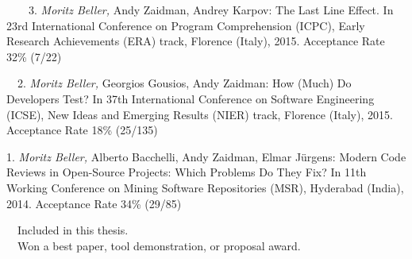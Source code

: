 \begin{etaremune}
{\item[\faTrophy~~\faFileTextO~~3.] \emph{Moritz Beller,} Andy Zaidman, Andrey Karpov: The Last
  Line Effect. In 23rd International Conference on Program Comprehension (ICPC), Early Research
  Achievements (ERA) track, Florence (Italy), 2015. Acceptance Rate 32\% (7/22)

\item[\faFileTextO~~2.] \emph{Moritz Beller,} Georgios Gousios, Andy Zaidman: How (Much) Do
  Developers Test? In 37th International Conference on Software Engineering (ICSE), New Ideas and
  Emerging Results (NIER) track, Florence (Italy), 2015. Acceptance Rate 18\% (25/135)

\item[1.] \emph{Moritz Beller,} Alberto Bacchelli, Andy Zaidman, Elmar Jürgens:
  Modern Code Reviews in Open-Source Projects: Which Problems Do They Fix? In 11th Working
  Conference on Mining Software Repositories (MSR), Hyderabad (India), 2014. Acceptance Rate 34\% (29/85)

}\end{etaremune}

\vspace{0.5cm}
\noindent
\faFileTextO~~Included in this thesis.\\
\faTrophy~~Won a best paper, tool demonstration, or proposal award.
